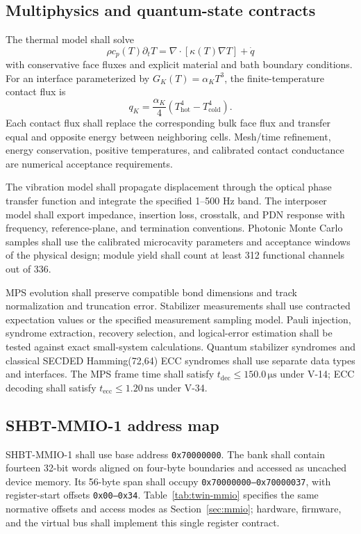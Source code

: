 \documentclass[11pt,a4paper]{article}
\newcommand{\unit}[1]{\,\mathrm{#1}}
\begin{document}
\subsection{Multiphysics and quantum-state contracts}
The thermal model shall solve
\[
 \rho c_p(T)\partial_tT=\nabla\cdot[\kappa(T)\nabla T]+\dot q
\]
with conservative face fluxes and explicit material and bath boundary conditions.
For an interface parameterized by $G_K(T)=\alpha_K T^3$, the finite-temperature
contact flux is
\[
 q_K=\frac{\alpha_K}{4}\left(T_{\mathrm{hot}}^4-T_{\mathrm{cold}}^4\right).
\]
Each contact flux shall replace the corresponding bulk face flux and transfer
equal and opposite energy between neighboring cells. Mesh/time refinement,
energy conservation, positive temperatures, and calibrated contact conductance
are numerical acceptance requirements.

The vibration model shall propagate displacement through the optical phase
transfer function and integrate the specified 1--500 Hz band. The interposer model
shall export impedance, insertion loss, crosstalk, and PDN response with frequency,
reference-plane, and termination conventions. Photonic Monte Carlo samples shall
use the calibrated microcavity parameters and acceptance windows of the physical
design; module yield shall count at least 312 functional channels out of 336.

MPS evolution shall preserve compatible bond dimensions and track normalization
and truncation error. Stabilizer measurements shall use contracted expectation
values or the specified measurement sampling model. Pauli injection, syndrome
extraction, recovery selection, and logical-error estimation shall be tested
against exact small-system calculations. Quantum stabilizer syndromes and
classical SECDED Hamming(72,64) ECC syndromes shall use separate data types and
interfaces. The MPS frame time shall satisfy $t_{\mathrm{dec}}\le150.0\unit{\mu s}$
under V-14; ECC decoding shall satisfy $t_{\mathrm{ecc}}\le1.20\unit{ns}$ under V-34.

\subsection{SHBT-MMIO-1 address map}
SHBT-MMIO-1 shall use base address \texttt{0x70000000}. The bank shall contain
fourteen 32-bit words aligned on four-byte boundaries and accessed as uncached
device memory. Its 56-byte span shall occupy \texttt{0x70000000--0x70000037},
with register-start offsets \texttt{0x00--0x34}. Table~\ref{tab:twin-mmio}
specifies the same normative offsets and access modes as Section~\ref{sec:mmio};
hardware, firmware, and the virtual bus shall implement this single register contract.
\end{document}
